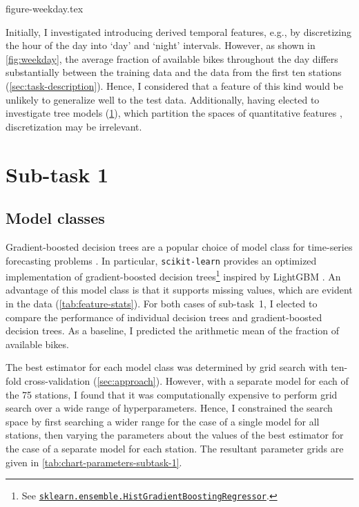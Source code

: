 \documentclass[11pt]{extarticle}
\newcommand{\sklearn}[2]{\href{https://scikit-learn.org/stable/modules/generated/sklearn.#1.#2.html}{\lstinline|sklearn.#1.#2|}}
\begin{document}
{figure-weekday.tex}

Initially, I investigated introducing derived temporal features, e.g., by discretizing
the hour of the day into `day' and `night' intervals.
However, as shown in \cref{fig:weekday}, the average fraction of available bikes
throughout the day differs substantially between the training data and the data from
the first ten stations (\cref{sec:task-description}).
Hence, I considered that a feature of this kind would be unlikely to generalize well to
the test data.
Additionally, having elected to investigate tree models (\cref{sec:subtask-1}), which
partition the spaces of quantitative features \parencite[155]{Flach2012},
discretization may be irrelevant.

\section{Sub-task 1}
\label{sec:subtask-1}

\subsection{Model classes}
\label{sec:subtask-1:model-classes}

Gradient-boosted decision trees are a popular choice of model class for time-series
forecasting problems \parencite{Bojer2021}.
In particular, \texttt{scikit-learn} provides an optimized implementation of
gradient-boosted decision trees\footnote{See
  \sklearn{ensemble}{HistGradientBoostingRegressor}.
} inspired by
LightGBM \parencite{Ke2017}.
An advantage of this model class is that it supports missing values, which are evident
in the data (\cref{tab:feature-stats}).
For both cases of sub-task~1, I elected to compare the performance of individual
decision trees and gradient-boosted decision trees.
As a baseline, I predicted the arithmetic mean of the fraction of available bikes.

The best estimator for each model class was determined by grid search with ten-fold
cross-validation (\cref{sec:approach}).
However, with a separate model for each of the 75 stations, I found that it was
computationally expensive to perform grid search over a wide range of hyperparameters.
Hence, I constrained the search space by first searching a wider range for the case of
a single model for all stations, then varying the parameters about the values of the
best estimator for the case of a separate model for each station.
The resultant parameter grids are given in \cref{tab:chart-parameters-subtask-1}.
\end{document}
